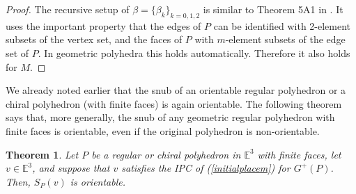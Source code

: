 \documentclass[12pt]{article}
\newtheorem{theorem}{Theorem}[section]
\theoremstyle{definition}\newtheorem{definition}{Definition}[section]
\begin{document}
\begin{proof}
The recursive setup of $\beta=\{\beta_k\}_{k=0,1,2}$ is similar to Theorem 5A1 in \cite{41}. It uses the important property that the edges of $P$ can be identified with 2-element subsets of the vertex set, and the faces of $P$ with $m$-element subsets of the edge set of $P$. In geometric polyhedra this holds automatically. Therefore it also holds for $M$. 
\end{proof}
\smallskip

We already noted earlier that the snub of an orientable regular polyhedron or a chiral polyhedron (with finite faces) is again orientable. The following theorem says that, more generally, the snub of any geometric regular polyhedron with finite faces is orientable, even if the original polyhedron is non-orientable. 
\smallskip

\begin{theorem}
\label{doublecover}
Let $P$ be a regular or chiral polyhedron in $\mathbb{E}^3$ with finite faces, let $v\in\mathbb{E}^3$, and suppose that $v$ satisfies the IPC of (\ref{initialplacem}) for $G^+(P)$.
Then, ${S}_P(v)$ is orientable.
\end{theorem}
  
\end{document}
